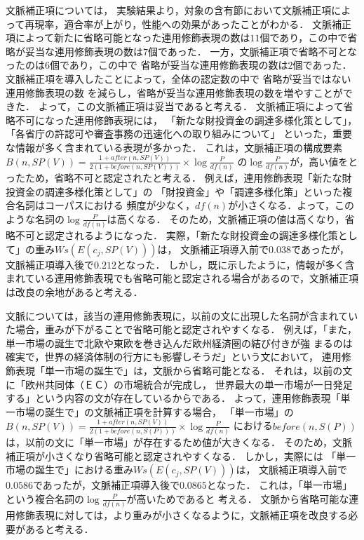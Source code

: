文脈補正項については，
実験結果より，対象の含有節において文脈補正項によって再現率，適合率が上がり，性能への効果があったことがわかる．
文脈補正項によって新たに省略可能となった連用修飾表現の数は$11$個であり，この中で省略が妥当な連用修飾表現の数は$7$個であった．
一方，文脈補正項で省略不可となったのは$6$個であり，この中で
省略が妥当な連用修飾表現の数は$2$個であった．
文脈補正項を導入したことによって，全体の認定数の中で
省略が妥当ではない連用修飾表現の数
を減らし，省略が妥当な連用修飾表現の数を増やすことができた．
よって，この文脈補正項は妥当であると考える．
文脈補正項によって省略不可になった連用修飾表現には，
「新たな財投資金の調達多様化策として」，
「各省庁の許認可や審査事務の迅速化への取り組みについて」
といった，重要な情報が多く含まれている表現が多かった．
これは，文脈補正項の構成要素
$B(n,SP(V))=\frac{1+after(n,SP(V))}{2(1+before(n,SP(V)))} \times \log \frac{P}{df(n)}$
の$\log \frac{P}{df(n)}$が，高い値をとったため，省略不可と認定されたと考える．
例えば，連用修飾表現「新たな財投資金の調達多様化策として」の
「財投資金」や「調達多様化策」といった複合名詞はコーパスにおける
頻度が少なく，$df(n)$が小さくなる．よって，このような名詞の$\log \frac{P}{df(n)}$は高くなる．
そのため，文脈補正項の値は高くなり，省略不可と認定されるようになった．
実際，「新たな財投資金の調達多様化策として」の重み$Ws(E(c_{j},SP(V)))$は，
文脈補正項導入前で$0.038$であったが，文脈補正項導入後で$0.212$となった．
しかし，既に示したように，情報が多く含まれている連用修飾表現でも省略可能と認定される場合があるので，文脈補正項は改良の余地があると考える．

文脈については，該当の連用修飾表現に，以前の文に出現した名詞が含まれていた場合，重みが下がることで省略可能と認定されやすくなる．
例えば，「また，単一市場の誕生で北欧や東欧を巻き込んだ欧州経済圏の結び付きが強
まるのは確実で，世界の経済体制の行方にも影響しそうだ」という文において，
連用修飾表現「単一市場の誕生で」は，文脈から省略可能となる．
それは，以前の文に「欧州共同体（ＥＣ）の市場統合が完成し，
世界最大の単一市場が一日発足する」という内容の文が存在しているからである．
よって，連用修飾表現「単一市場の誕生で」の文脈補正項を計算する場合，
「単一市場」の
$B(n,SP(V))=\frac{1+after(n,SP(V))}{2(1+before(n,S(P)))} \times \log \frac{P}{df(n)}$
における$before(n,S(P))$は，以前の文に「単一市場」が存在するため値が大きくなる．
そのため，文脈補正項が小さくなり省略可能と認定されやすくなる．
しかし，実際には
「単一市場の誕生で」における重み$Ws(E(c_{j},SP(V)))$は，
文脈補正項導入前で$0.0586$であったが，文脈補正項導入後で$0.0865$となった．
これは，「単一市場」という複合名詞の$\log \frac{P}{df(n)}$が高いためであると
考える．
文脈から省略可能な連用修飾表現に対しては，より重みが小さくなるように，文脈補正項を改良する必要があると考える．
